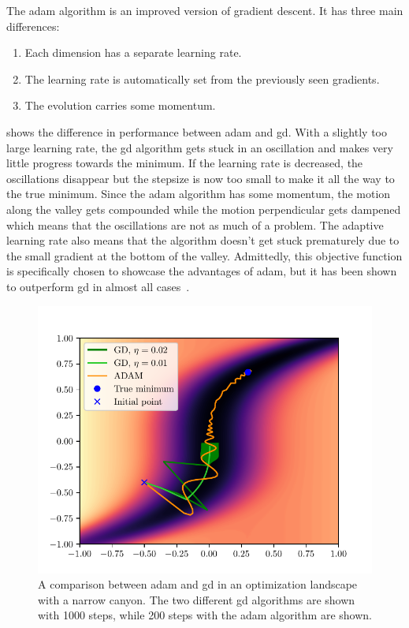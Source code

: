 The \gls{adam} algorithm is an improved version of gradient descent.
It has three main differences:
\begin{enumerate}
	\item Each dimension has a separate learning rate.
	\item The learning rate is automatically set from the previously seen gradients.
	\item The evolution carries some momentum.
\end{enumerate}
 shows the difference in performance between \gls{adam}
and \gls{gd}.
With a slightly too large learning rate, the \gls{gd} algorithm gets stuck in an
oscillation and makes very little progress towards the minimum.
If the learning rate is decreased, the oscillations disappear but the stepsize
is now too small to make it all the way to the true minimum. 
Since the \gls{adam} algorithm has some momentum, the motion along the valley
gets compounded while the motion perpendicular gets dampened which means that
the oscillations are not as much of a problem.
The adaptive learning rate also means that the algorithm doesn't get stuck
prematurely due to the small gradient at the bottom of the valley.
Admittedly, this objective function is specifically chosen to showcase the
advantages of \gls{adam}, but it has been shown to outperform \gls{gd} in almost
all cases~\cite{kingma2017adam}.
\begin{figure}[htpb]
	\centering
	\includegraphics{chapters/theory/adam_vs_gd_plot.pdf}
	\caption{
		A comparison between \gls{adam} and \gls{gd} in an optimization
		landscape with a narrow canyon. The two different \gls{gd} algorithms
		are shown with 1000 steps, while 200 steps with the \gls{adam} algorithm
		are shown.
	}
	\label{fig:adam_vs_gd}
\end{figure}

